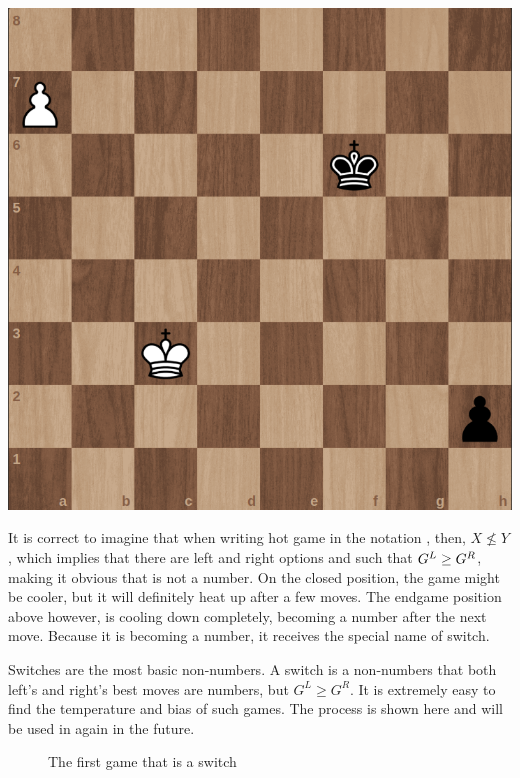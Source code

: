 \begin{center}
	\includegraphics[scale=0.15]{images/chess_hot} 
\end{center}

It is correct to imagine that when writing hot game \Gm{} in the notation , then, $X \nleq Y$, which implies that there are left and right options  and  such that $\mbox{$G^L$} \ge \mbox{$G^R$}$, making it obvious that \Gm{} is not a number. On the closed position, the game might be cooler, but it will definitely heat up after a few moves. The endgame position above however, is cooling down completely, becoming a number after the next move. Because it is becoming a number, it receives the special name of switch.

Switches are the most basic non-numbers. A switch is a non-numbers \Gm{} that both left's and right's best moves are numbers, but $G^L \ge G^R$. It is extremely easy to find the temperature and bias of such games. The process is shown here and will be used in again in the future.

\begin{figure} [!ht]
	\begin{center}
	\end{center}
	\caption{The first game that is a switch}
\end{figure}

